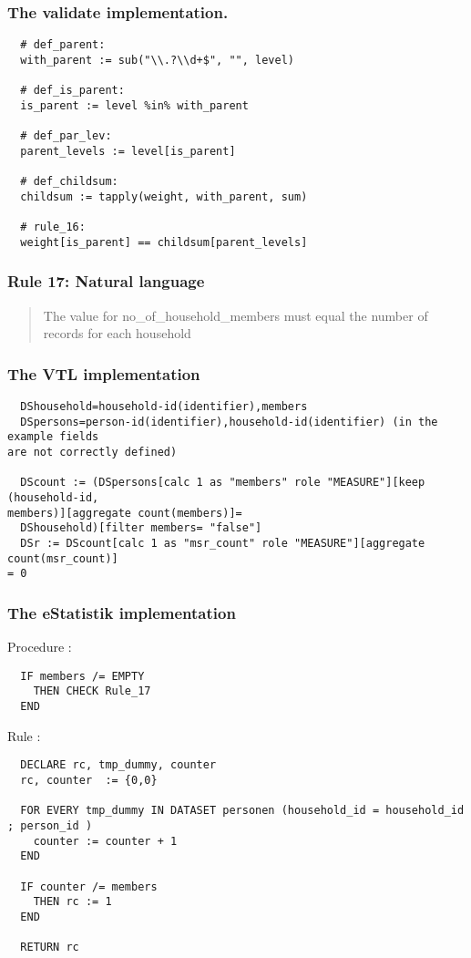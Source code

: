 \subsubsection*{The validate implementation.}
\begin{verbatim}
  # def_parent:
  with_parent := sub("\\.?\\d+$", "", level)

  # def_is_parent:
  is_parent := level %in% with_parent

  # def_par_lev:
  parent_levels := level[is_parent]

  # def_childsum:
  childsum := tapply(weight, with_parent, sum)

  # rule_16:
  weight[is_parent] == childsum[parent_levels]
\end{verbatim}


\newpage

\subsubsection*{  Rule 17: Natural language}
\begin{quote}


The value for no\_of\_household\_members must equal the number of records for each household


\end{quote}
\subsubsection*{The VTL implementation}
\begin{verbatim}
  DShousehold=household-id(identifier),members
  DSpersons=person-id(identifier),household-id(identifier) (in the example fields
are not correctly defined)

  DScount := (DSpersons[calc 1 as "members" role "MEASURE"][keep (household-id,
members)][aggregate count(members)]=
  DShousehold)[filter members= "false"]
  DSr := DScount[calc 1 as "msr_count" role "MEASURE"][aggregate count(msr_count)]
= 0

\end{verbatim}
\subsubsection*{The eStatistik implementation}
\noindent
Procedure :
\begin{verbatim}
  IF members /= EMPTY
    THEN CHECK Rule_17
  END
\end{verbatim}
\noindent
Rule :
\begin{verbatim}
  DECLARE rc, tmp_dummy, counter
  rc, counter  := {0,0}

  FOR EVERY tmp_dummy IN DATASET personen (household_id = household_id ; person_id )
    counter := counter + 1
  END

  IF counter /= members
    THEN rc := 1
  END

  RETURN rc
\end{verbatim}

